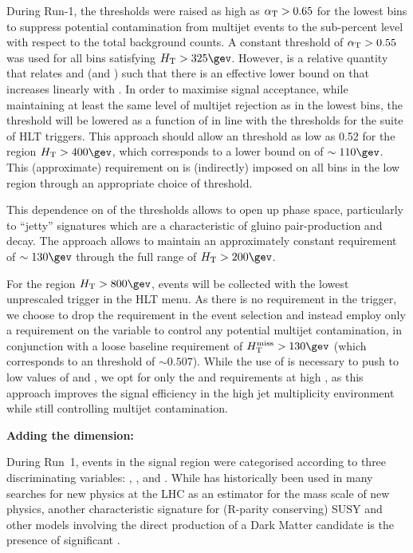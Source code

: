 During Run-1, the \alphat thresholds were raised as high as $\alpha_{\text{T}} >
0.65$ for the lowest \scalht bins to suppress potential contamination
from multijet events to the sub-percent level with respect to the
total background counts. A constant threshold of $\alpha_{\text{T}} > 0.55$ was
used for all bins satisfying $\scalht > 325\gev$. However, \alphat is
a relative quantity that relates \scalht and \mht (and \dht) such that
there is an effective lower bound on \mht that increases linearly with
\scalht. In order to maximise signal acceptance, while maintaining at
least the same level of multijet rejection as in the lowest \scalht
bins, the \alphat threshold will be lowered as a function of \scalht
in line with the thresholds for the suite of HLT triggers. This
approach should allow an \alphat threshold as low as 0.52 for the
region $\scalht > 400\gev$, which corresponds to a lower bound on \mht
of $\sim110\gev$. This (approximate) requirement on \mht is
(indirectly) imposed on all bins in the low \scalht region through an
appropriate choice of \alphat threshold.

This dependence on \scalht of the \alphat thresholds allows to open up
phase space, particularly to ``jetty'' signatures which are a
characteristic of gluino pair-production and decay. The approach
allows to maintain an approximately constant \mht requirement of
$\sim130\gev$ through the full range of $\scalht > 200\gev$.

For the region $\scalht > 800\gev$, events will be collected with the
lowest unprescaled \scalht trigger in the HLT menu. As there is no
\alphat requirement in the trigger, we choose to drop the \alphat
requirement in the event selection and instead employ only a
requirement on the variable \bdphi to control any potential multijet
contamination, in conjunction with a loose baseline requirement of
$\mht > 130\gev$ (which corresponds to an \alphat threshold of
$\sim0.507$). While the use of \alphat is necessary to push to low
values of \scalht and \mht, we opt for only the \bdphi and \mht
requirements at high \scalht, as this approach improves the signal
efficiency in the high jet multiplicity environment while still
controlling multijet contamination.

{\bf Adding the \mht dimension:}

During Run~1, events in the signal region were categorised according
to three discriminating variables: \scalht, \njet, and \nb. While
\scalht has historically been used in many searches for new physics at
the LHC as an estimator for the mass scale of new physics, another
characteristic signature for (R-parity conserving) SUSY and other
models involving the direct production of a Dark Matter candidate is
the presence of significant \met.

